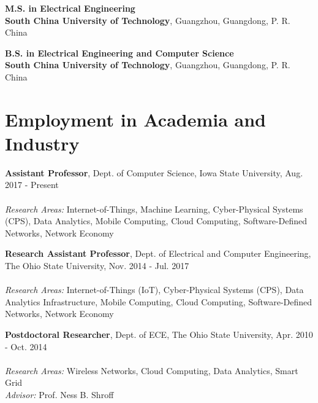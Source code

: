 \documentclass[overlapped,line,letterpaper]{res1}
\begin{document}
\begin{resume}
{\bf M.S. in Electrical Engineering} \\ %
{\bf South China University of Technology}, Guangzhou, Guangdong, P. R. China
\vspace{-.02in}

{\bf B.S. in Electrical Engineering and Computer Science} \\ %
{\bf South China University of Technology}, Guangzhou, Guangdong, P. R. China



\section{\bf \large Employment in Academia and Industry}

\vspace{.1in}
{\bf Assistant Professor}, {Dept. of Computer Science, Iowa State University, Aug. 2017 - Present} \\
\vspace{-.16in}\\
{\em Research Areas:} Internet-of-Things, Machine Learning, Cyber-Physical Systems (CPS), Data Analytics, Mobile Computing, Cloud Computing, Software-Defined Networks, Network Economy \\
\vspace{-.22in}

\vspace{.1in}
{\bf Research Assistant Professor}, {Dept. of Electrical and Computer Engineering, The Ohio State University, Nov. 2014 - Jul. 2017} \\
\vspace{-.16in}\\
{\em Research Areas:} Internet-of-Things (IoT), Cyber-Physical Systems (CPS), Data Analytics Infrastructure, Mobile Computing, Cloud Computing, Software-Defined Networks, Network Economy \\
\vspace{-.22in}

{\bf Postdoctoral Researcher}, {Dept. of ECE, The Ohio State University, Apr. 2010 - Oct. 2014} \\
\vspace{-.16in}\\
{\em Research Areas:} Wireless Networks, Cloud Computing, Data Analytics, Smart Grid\\ 
\smallskip
{\em Advisor:} Prof. Ness B. Shroff \\
\vspace{-.22in}



\end{resume}
\end{document}
